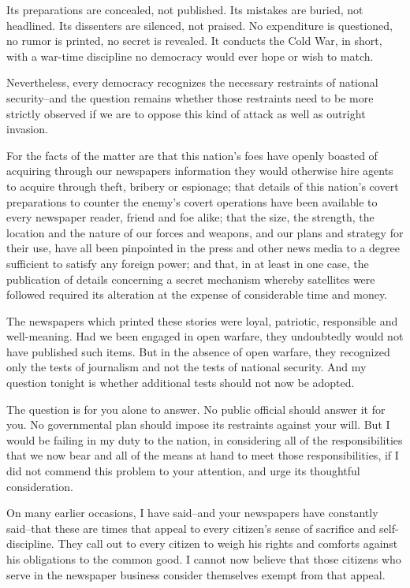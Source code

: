\documentclass{article}
\begin{document}
Its preparations are concealed, not published. Its mistakes are buried, not headlined. Its dissenters are silenced, not praised. No expenditure is questioned, no rumor is printed, no secret is revealed. It conducts the Cold War, in short, with a war-time discipline no democracy would ever hope or wish to match.

Nevertheless, every democracy recognizes the necessary restraints of national security--and the question remains whether those restraints need to be more strictly observed if we are to oppose this kind of attack as well as outright invasion.

For the facts of the matter are that this nation's foes have openly boasted of acquiring through our newspapers information they would otherwise hire agents to acquire through theft, bribery or espionage; that details of this nation's covert preparations to counter the enemy's covert operations have been available to every newspaper reader, friend and foe alike; that the size, the strength, the location and the nature of our forces and weapons, and our plans and strategy for their use, have all been pinpointed in the press and other news media to a degree sufficient to satisfy any foreign power; and that, in at least in one case, the publication of details concerning a secret mechanism whereby satellites were followed required its alteration at the expense of considerable time and money.

The newspapers which printed these stories were loyal, patriotic, responsible and well-meaning. Had we been engaged in open warfare, they undoubtedly would not have published such items. But in the absence of open warfare, they recognized only the tests of journalism and not the tests of national security. And my question tonight is whether additional tests should not now be adopted.

The question is for you alone to answer. No public official should answer it for you. No governmental plan should impose its restraints against your will. But I would be failing in my duty to the nation, in considering all of the responsibilities that we now bear and all of the means at hand to meet those responsibilities, if I did not commend this problem to your attention, and urge its thoughtful consideration.

On many earlier occasions, I have said--and your newspapers have constantly said--that these are times that appeal to every citizen's sense of sacrifice and self-discipline. They call out to every citizen to weigh his rights and comforts against his obligations to the common good. I cannot now believe that those citizens who serve in the newspaper business consider themselves exempt from that appeal.
\end{document}
